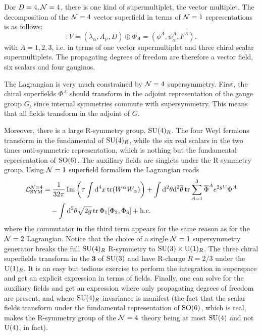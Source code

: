 \documentclass[a4paper,11pt]{article}
\begin{document}
    Dor $D=4,\mathcal{N}=4$, there is one kind of supermultiplet, the vector multiplet. The decomposition of the $\mathcal{N} = 4$ vector superfield in terms of $\mathcal{N} = 1$ representations is as follows:
    \begin{equation}
        [\mN = 4 \text{ vector multiplet}] : V = (\lambda_\alpha, A_\mu, D) \oplus \Phi_A = (\phi^A,\psi^A_\alpha,F^A).
    \end{equation}
    with $A=1,2,3$, i.e. in terms of one vector supermultiplet and three chiral scalar supermultiplets. The propagating degrees of freedom are therefore a vector field, six scalars and four gauginos.
    
    The Lagrangian is very much constrained by $\mathcal{N} = 4$ supersymmetry. First, the chiral superfields $\Phi^A$ should transform in the adjoint representation of the gauge group $G$, since internal symmetries commute with supersymmetry. This means that all fields transform in the adjoint of $G$.
    
    Moreover, there is a large R-symmetry group, $\text{SU}(4)_R$. The four Weyl fermions transform in the fundamental of $\text{SU}(4)_R$, while the six real scalars in the two times anti-symmetric representation, which is nothing but the fundamental representation of $\text{SO}(6)$. The auxiliary fields are singlets under the R-symmetry group. Using $\mathcal{N} = 1$ superfield formalism the Lagrangian reads
    \begin{align}
        \begin{split}
            \mathcal{L}^{\mathcal{N}=4}_{\text{SYM}} &= \frac{1}{32\pi}\Im \left(\tau\int\text{d}^4x\tr(W^\alpha W_\alpha)\right)+\int\text{d}^2\theta\text{d}^2\overline{\theta}\tr\sum^3_{A=1}\overline{\Phi}^Ae^{2gV}\Phi^A\\
            &\quad-\int\text{d}^2\theta\sqrt{2g}\tr\Phi_1[\Phi_2,\Phi_3]+\text{h.c.}
        \end{split}\label{eq:N4lag}
    \end{align}
    where the commutator in the third term appears for the same reason as for the $\mathcal{N} = 2$ Lagrangian. Notice that the choice of a single $\mathcal{N} = 1$ supersymmetry generator breaks the full $\text{SU}(4)_R$ R-symmetry to $\text{SU}(3)\times \text{U}(1)_R$. The three chiral superfields transform in the $\boldsymbol{3}$ of $\text{SU}(3)$ and have R-charge $R = 2/3$ under the $\text{U}(1)_R$. It is an easy but tedious exercise to perform the integration in superspace and get an explicit expression in terms of fields. Finally, one can solve for the auxiliary fields and get an expression where only propagating degrees of freedom are present, and where $\text{SU}(4)_R$ invariance is manifest (the fact that the scalar fields transform under the fundamental representation of $\text{SO}(6)$, which is real, makes the R-symmetry group of the $\mathcal{N} = 4$ theory being at most $\text{SU}(4)$ and not $\text{U}(4)$, in fact).
\end{document}
